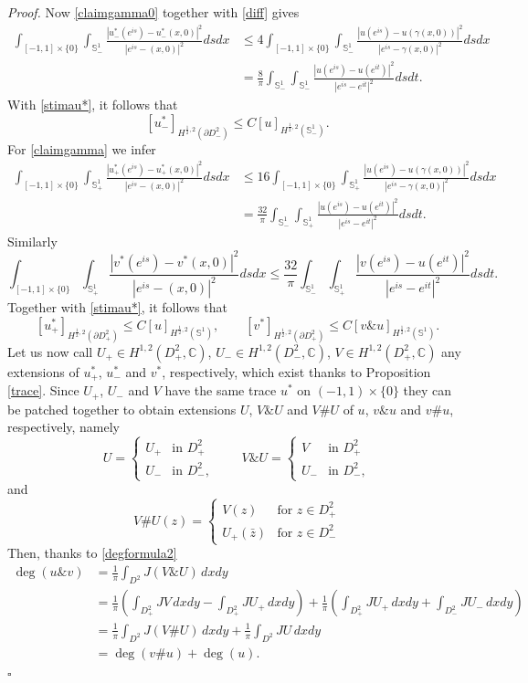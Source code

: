 \documentclass[10pt,a4paper]{amsart}
\newenvironment{proof}{\noindent\emph{Proof.}}{\hfill$\square$\medskip}
\newcommand{\sph}{\mathbb{S}}
\begin{document}
\begin{proof}
Now \eqref{claimgamma0} together with \eqref{diff} gives
\[\begin{split}
\int_{[-1,1]\times \{0\}}\int_{\sph^1_-} \frac{|u^*_-(e^{is})-u^*_-(x,0)|^2}{|e^{is}-(x,0)|^2}ds dx&\le {4} \int_{[-1,1]\times \{0\}}\int_{\sph^1_-} \frac{|u(e^{is})-u(\gamma(x,0))|^2}{|e^{is}-\gamma(x,0)|^2}dsdx\\
&= \frac{8}{\pi} \int_{\sph^1_-}\int_{\sph^1_-}\frac{|u(e^{is})-u(e^{it})|^2}{|e^{is}-e^{it}|^2}dsdt.
\end{split}\]
With \eqref{stimau*}, it follows that
$$[u^*_-]_{H^{\frac12,2}(\partial D^2_-)}\le C[u]_{H^{\frac12,2}(\sph^1_-)}.$$
For \eqref{claimgamma} we infer
\[\begin{split}
\int_{[-1,1]\times \{0\}}\int_{\sph^1_+} \frac{|u^*_+(e^{is})-u^*_+(x,0)|^2}{|e^{is}-(x,0)|^2}dsdx& \le 16\int_{[-1,1]\times \{0\}}\int_{\sph^1_+} \frac{|u(e^{is})-u(\gamma(x,0))|^2}{|e^{is}-\gamma(x,0)|^2}dsdx\\
&=\frac{32}{\pi}  \int_{\sph^1_-}\int_{\sph^1_+}\frac{|u(e^{is})-u(e^{it})|^2}{|e^{is}-e^{it}|^2}dsdt.
\end{split}\]
Similarly
$$\int_{[-1,1]\times \{0\}}\int_{\sph^1_+} \frac{|v^*(e^{is})-v^*(x,0)|^2}{|e^{is}-(x,0)|^2}dsdx\le \frac{32}{\pi} \int_{\sph^1_-}\int_{\sph^1_+}\frac{|v(e^{is})-u(e^{it})|^2}{|e^{is}-e^{it}|^2}dsdt.$$
Together with \eqref{stimau*}, it follows that 
$$[u^*_+]_{H^{\frac12,2}(\partial D^2_+)}\le C[u]_{H^{\frac12,2}(\sph^1)},\qquad [v^*]_{H^{\frac12,2}(\partial D^2_+)}\le C[v\&u]_{H^{\frac12,2}(\sph^1)}.$$
Let us now call $U_+\in H^{1,2}(D^2_+,\mathbb{C})$, $U_-\in H^{1,2}(D^2_-,\mathbb{C})$,  $V\in H^{1,2}(D^2_+,\mathbb{C})$ any extensions of $u^*_+$, $u^*_-$ and $v^*$, respectively, which exist thanks to Proposition \ref{trace}.
Since $U_+$, $U_-$ and $V$ have the same trace $u^*$ on $(-1,1)\times \{0\}$ they can be patched together to obtain extensions $U$, $V\&U$ and $V\#U$ of $u$, $v\&u$ and  $v\#u$, respectively, namely
\[
U=\begin{cases}
U_+&\text{in }D^2_+\\
U_-&\text{in }D^2_-,
\end{cases}
\qquad
V\&U=\begin{cases}
V&\text{in }D^2_+\\
U_-&\text{in }D^2_-,
\end{cases}
\]
and
\[
V\#U(z)=\begin{cases}
V(z)&\text{for }z\in D^2_+\\
U_+(\bar z)&\text{for }z\in D^2_-
\end{cases}
\]
Then, thanks to \eqref{degformula2}
\[\begin{split}
\deg(u\&v)&=\frac{1}{\pi}\int_{D^2} J(V\&U)\, dxdy\\
&=\frac{1}{\pi}\left(\int_{D^2_+} JV\, dxdy-\int_{D^2_+} JU_+\, dxdy\right)+ \frac{1}{\pi}\left(\int_{D^2_+} JU_+\, dxdy+\int_{D^2_-} JU_-\, dxdy\right)\\
&=\frac{1}{\pi}\int_{D^2} J(V\#U)\, dxdy+ \frac{1}{\pi}\int_{D^2} JU\, dxdy\\
&=\deg(v\#u)+\deg(u).
\end{split}\]
\end{proof}
\end{document}
